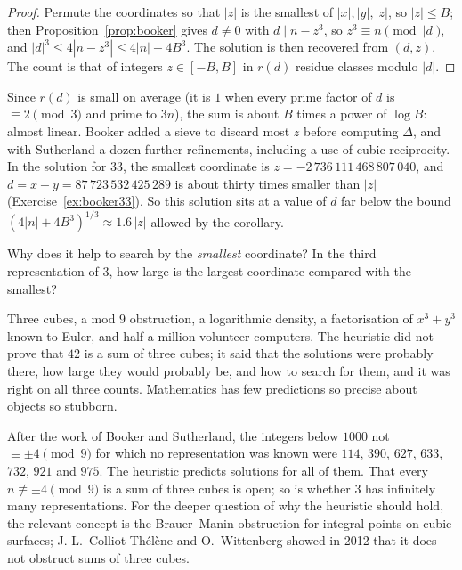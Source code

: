 \begin{proof}
Permute the coordinates so that $|z|$ is the smallest of $|x|,|y|,|z|$, so $|z|\le B$; then Proposition~\ref{prop:booker} gives $d\ne0$ with $d\mid n-z^3$, so $z^3\equiv n\pmod{|d|}$, and $|d|^3\le4|n-z^3|\le4|n|+4B^3$. The solution is then recovered from
$(d,z)$. The count is that of integers $z\in[-B,B]$ in $r(d)$ residue classes modulo $|d|$.
\end{proof}

Since $r(d)$ is small on average (it is $1$ when every prime factor of $d$ is $\equiv2\pmod3$ and prime to $3n$), the sum is about $B$ times a power of $\log B$: almost linear. Booker
added a sieve to discard most $z$ before computing $\Delta$, and with Sutherland a dozen further refinements, including a use of cubic reciprocity. In the solution for
$33$, the smallest coordinate is $z=-2\,736\,111\,468\,807\,040$, and $d=x+y=87\,723\,532\,425\,289$ is about thirty times smaller than $|z|$ (Exercise~\ref{ex:booker33}). So this solution sits at a value of $d$ far below the bound $(4|n|+4B^3)^{1/3}\approx1.6\,|z|$ allowed by the corollary.

\begin{think}
Why does it help to search by the \emph{smallest} coordinate? In the third representation of $3$, how large is the largest coordinate compared with the smallest?
\end{think}

\begin{beauty}
Three cubes, a mod $9$ obstruction, a logarithmic density, a factorisation of $x^3+y^3$ known to Euler, and half a million volunteer computers. The heuristic did not prove that $42$ is a sum of
three cubes; it said that the solutions were probably there, how large they would probably be, and how to search for them, and it was right on all three counts. Mathematics has few
predictions so precise about objects so stubborn.
\end{beauty}

\begin{remark}\label{rem:open3cubes}
After the work of Booker and Sutherland, the integers below $1000$ not $\equiv\pm4\pmod9$ for which no representation was known were $114$, $390$, $627$, $633$, $732$, $921$ and $975$. The heuristic predicts
solutions for all of them. That every $n\not\equiv\pm4\pmod9$ is a sum of three cubes is open; so is whether $3$ has infinitely many representations. For the deeper question of why the
heuristic should hold, the relevant concept is the Brauer--Manin obstruction for integral points on cubic surfaces; J.-L.~Colliot-Th\'el\`ene and O.~Wittenberg showed in 2012 that it does not
obstruct sums of three cubes.
\end{remark}

